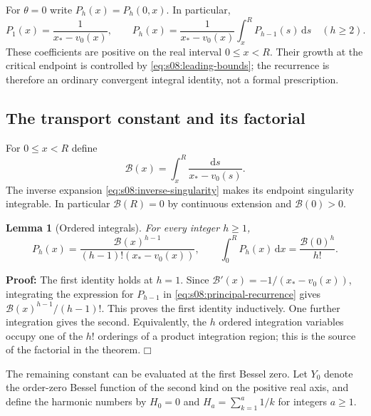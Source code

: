 \documentclass[a4paper,10pt]{article}
\numberwithin{equation}{section}
\newcommand{\dd}{\mathrm{d}}
\theoremstyle{paperplain}
\newtheorem{lmm}[thm]{Lemma}
\theoremstyle{paperremark}
\theoremstyle{paperplain}
\newenvironment{prf}{\noindent \textbf{Proof: }}{\hfill $\mdlgwhtsquare$\par\addvspace{0.5\baselineskip}}
\begin{document}
For $\theta=0$ write $P_h(x)=P_h(0,x)$. In particular,
\begin{equation}\label{eq:s08:principal-recurrence}
 P_1(x)=\frac1{x_*-v_0(x)},\qquad
 P_h(x)=\frac1{x_*-v_0(x)}\int_x^R P_{h-1}(s)\,\dd s
                                      \quad(h\geq2).
\end{equation}
These coefficients are positive on the real interval $0\leq x<R$.
Their growth at the critical endpoint is controlled by
\eqref{eq:s08:leading-bounds}; the recurrence is therefore an
ordinary convergent integral identity, not a formal prescription.

\subsection{The transport constant and its factorial}
\label{subsec:s08:03}

For $0\leq x<R$ define
\begin{equation}\label{eq:s08:transport-integral}
 \mathcal B(x)=\int_x^R\frac{\dd s}{x_*-v_0(s)}.
\end{equation}
The inverse expansion \eqref{eq:s08:inverse-singularity} makes its
endpoint singularity integrable. In particular $\mathcal B(R)=0$
by continuous extension and $\mathcal B(0)>0$.

\begin{lmm}[Ordered integrals]\label{lmm:s08:ordered-integrals}
For every integer $h\geq1$,
\begin{equation}\label{eq:s08:ordered-integrals}
 P_h(x)=\frac{\mathcal B(x)^{h-1}}
                      {(h-1)!(x_*-v_0(x))},\qquad
 \int_0^R P_h(x)\,\dd x=\frac{\mathcal B(0)^h}{h!}.
\end{equation}
\end{lmm}
\begin{prf}
The first identity holds at $h=1$. Since
$\mathcal B'(x)=-1/(x_*-v_0(x))$, integrating the expression for
$P_{h-1}$ in \eqref{eq:s08:principal-recurrence} gives
$\mathcal B(x)^{h-1}/(h-1)!$. This proves the first identity
inductively. One further integration gives the second. Equivalently,
the $h$ ordered integration variables occupy one of the $h!$
orderings of a product integration region; this is the source of
the factorial in the theorem.
\end{prf}

The remaining constant can be evaluated at the first Bessel zero.
Let $Y_0$ denote the order-zero Bessel function of the second kind
on the positive real axis, and define the harmonic numbers by
$H_0=0$ and $H_a=\sum_{k=1}^a1/k$ for integers $a\geq1$.
\end{document}
